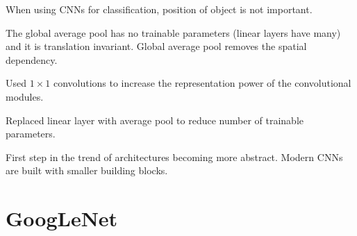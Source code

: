 \documentclass{report}
\begin{document}
\begin{concept}
    When using CNNs for classification, position of object is not important.

    The global average pool has no trainable parameters (linear layers have many) and it is translation invariant. Global average pool removes the spatial dependency.
\end{concept}

\begin{concept}
    Used $1 \times 1$ convolutions to increase the representation power of the convolutional modules.

    Replaced linear layer with average pool to reduce number of trainable parameters.

    First step in the trend of architectures becoming more abstract. Modern CNNs are built with smaller building blocks.
\end{concept}

\section{GoogLeNet}
\end{document}
